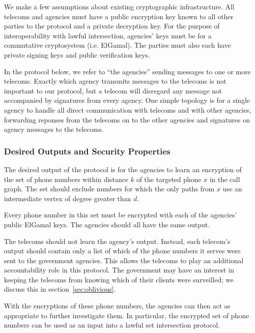 We make a few assumptions about existing cryptographic infrastructure. All telecoms and agencies must have a public encryption key known to all other parties to the protocol and a private decryption key. For the purpose of interoperability with lawful intersection, agencies' keys must be for a commutative cryptosystem (i.e. ElGamal). The parties must also each have private signing keys and public verification keys.



In the protocol below, we refer to ``the agencies'' sending messages to one or more telecoms. Exactly which agency transmits messages to the telecoms is not important to our protocol, but a telecom will disregard any message not accompanied by signatures from every agency. One simple topology is for a single agency to handle all direct communication with telecoms and with other agencies, forwarding reponses from the telecoms on to the other agencies and signatures on agency messages to the telecoms.



\subsubsection{Desired Outputs and Security Properties}



The desired output of the protocol is for the agencies to learn an encryption of the set of phone numbers within distance $k$ of the targeted phone $x$ in the call graph. The set should exclude numbers for which the only paths from $x$ use an intermediate vertex of degree greater than $d$.



Every phone number in this set must be encrypted with each of the agencies' public ElGamal keys. The agencies should all have the same output.



The telecoms should not learn the agency's output. Instead, each telecom's output should contain only a list of which of the phone numbers it serves were sent to the government agencies. This allows the telecoms to play an additional accountability role in this protocol. The government may have an interest in keeping the telecoms from knowing which of their clients were surveilled; we discuss this in section~\ref{sec:oblivious}.



With the encryptions of these phone numbers, the agencies can then act as appropriate to further investigate them. In particular, the encrypted set of phone numbers can be used as an input into a lawful set intersection protocol.



